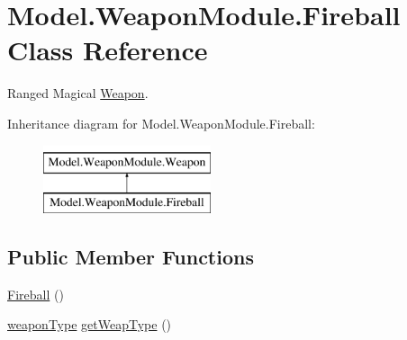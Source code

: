 \hypertarget{class_model_1_1_weapon_module_1_1_fireball}{}\section{Model.\+Weapon\+Module.\+Fireball Class Reference}
\label{class_model_1_1_weapon_module_1_1_fireball}


Ranged Magical \hyperlink{interface_model_1_1_weapon_module_1_1_weapon}{Weapon}.  


Inheritance diagram for Model.\+Weapon\+Module.\+Fireball\+:\begin{figure}[H]
\begin{center}
\leavevmode
\includegraphics[height=2.000000cm]{class_model_1_1_weapon_module_1_1_fireball}
\end{center}
\end{figure}
\subsection*{Public Member Functions}
\begin{DoxyCompactItemize}
\item 
\hyperlink{class_model_1_1_weapon_module_1_1_fireball_a60594308438b38900bebbab15f2e62a4}{Fireball} ()
\item 
\hyperlink{namespace_model_1_1_weapon_module_a3390c266f89e3399c2bc7fa31f13cbec}{weapon\+Type} \hyperlink{class_model_1_1_weapon_module_1_1_fireball_aa979cf9b7c07e36b3fb55ee6d6a43e8b}{get\+Weap\+Type} ()
\end{DoxyCompactItemize}
